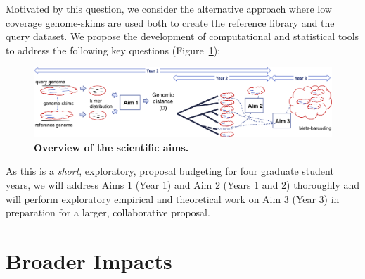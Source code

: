 Motivated by this question, we consider the alternative approach where low coverage genome-skims are used both to create the reference library and the query dataset.
We propose the development of computational and statistical tools to address the
following key questions (Figure~\ref{fig:overview}):
\begin{packed_desc}
\item [Aim 1:] 
\item [Aim 2:] 
\item [Aim 3:] 
\end{packed_desc}
\begin{figure}
\centering
  \includegraphics[width=1\textwidth]{fig/Overview.png}
\vspace{-20pt}\caption{{\bf Overview of the scientific aims.}}
  \label{fig:overview}
\end{figure}
As this is a \emph{short}, exploratory, proposal budgeting for four graduate student years, we will address Aims 1 (Year 1) and Aim 2 (Years 1 and 2) thoroughly and will perform exploratory empirical and theoretical work on Aim 3 (Year 3) in preparation for a larger, collaborative proposal.

\section{Broader Impacts}


